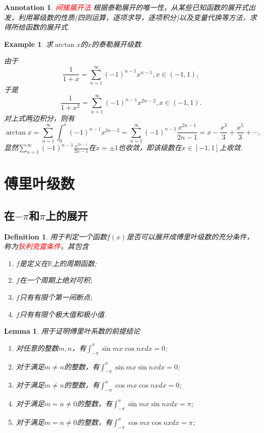 \documentclass{article}
\newtheorem{lemma}[theorem]{Lemma}
\newtheorem{example}[theorem]{Example}
\newtheorem{definition}[theorem]{Definition}
\newtheorem{annotation}[theorem]{Annotation}
\newcommand{\redt}[1]{\textcolor{red}{#1}}
\begin{document}
\begin{annotation}
\rm \redt{间接展开法} 根据泰勒展开的唯一性，从某些已知函数的展开式出发，利用幂级数的性质(四则运算，逐项求导，逐项积分)以及变量代换等方法，求得所给函数的展开式.
\end{annotation}

\begin{example}
\rm 求$\arctan x$的$x$的泰勒展开级数.

\rm 由于
$$
\frac{1}{1+x} = \sum\limits_{n=1}^{\infty} (-1)^{n-1}x^{n-1}, x \in (-1,1), 
$$
于是
$$
\frac{1}{1+x^2} = \sum\limits_{n=1}^{\infty} (-1)^{n-1}x^{2n-2}, x \in (-1,1). 
$$
对上式两边积分，则有
$$
\arctan x = \sum\limits_{n=1}^{\infty} \int_0^{x} (-1)^{n-1}x^{2n-2}  =   \sum\limits_{n=1}^{\infty}(-1)^{n-1}\frac{x^{2n-1}}{2n-1} = x - \frac{x^3}{3} + \frac{x^5}{3} + \cdots,
$$
显然$\sum\limits_{n=1}^{\infty}(-1)^{n-1}\frac{x^{2n-1}}{2n-1}$在$x = \pm 1$也收敛，即该级数在$x \in [-1,1]$上收敛. 
\end{example}


\newpage
\section{傅里叶级数}
\subsection{在$-\pi$和$\pi$上的展开}


\begin{definition}
\rm 用于判定一个函数$f(x)$是否可以展开成傅里叶级数的充分条件，称为\redt{狄利克雷条件}，其包含
\begin{enumerate}
	\item $f$是定义在$\mathbb{R}$上的周期函数;
	\item $f$在一个周期上绝对可积;
	\item $f$只有有限个第一间断点;
	\item $f$只有有限个极大值和极小值. 
\end{enumerate}
\end{definition}


\begin{lemma}
\rm 用于证明傅里叶系数的前提结论
\begin{enumerate}
	\item 对任意的整数$m,n$，有$\int_{-\pi}^{\pi} \sin mx\cos nxdx= 0$;
	\item 对于满足$m \neq n$的整数，有$\int_{-\pi}^{\pi} \sin mx\sin nxdx = 0$;
	\item 对于满足$m \neq n$的整数，有$\int_{-\pi}^{\pi} \cos mx\cos nxdx = 0$;
	\item 对于满足$m = n \neq 0$的整数，有$\int_{-\pi}^{\pi} \sin mx\sin nxdx = \pi$;
	\item 对于满足$m = n \neq 0$的整数，有$\int_{-\pi}^{\pi} \cos mx\cos nxdx = \pi$;
\end{enumerate}
\end{lemma}
\end{document}
